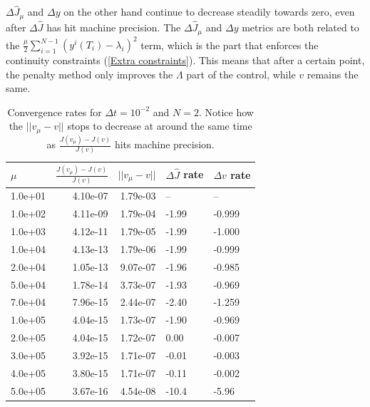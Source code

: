 \\
\\
$\Delta\hat J_{\mu}$ and $\Delta y$ on the other hand continue to decrease steadily towards zero, even after $\Delta \hat J$ has hit machine precision. The $\Delta\hat J_{\mu}$ and $\Delta y$ metrics are both related to the $\frac{\mu }{2}\sum_{i=1}^{N-1}(y^i(T_{i})-\lambda_i)^2$ term, which is the part that enforces the continuity constraints (\ref{Extra constraints}). This means that after a certain point, the penalty method only improves the $\Lambda$ part of the control, while $v$ remains the same. 
\begin{table}[!h]
\centering
\caption{Convergence rates for $\Delta t=10^{-2}$ and $N=2$. Notice how the $||v_{\mu}-v||$ stops to decrease at around the same time as $\frac{J(v_{\mu})-J(v)}{J(v)}$ hits machine precision.}
\label{Cosn_rate_table}
\begin{tabular}{lrrll}
\toprule
{} $\mu$&  $\frac{J(v_{\mu})-J(v)}{J(v)}$ &   $||v_{\mu}-v||$ &        $\Delta \hat J$ rate &        $\Delta v$ rate \\
\midrule
1.0e+01 &      4.10e-07 & 1.79e-03 &            -- &            -- \\
1.0e+02 &      4.11e-09 & 1.79e-04 & -1.99 & -0.999 \\
1.0e+03 &      4.12e-11 & 1.79e-05 & -1.99 & -1.000 \\
1.0e+04 &      4.13e-13 & 1.79e-06 & -1.99 & -0.999 \\
2.0e+04 &      1.05e-13 & 9.07e-07 & -1.96 & -0.985 \\
5.0e+04 &      1.78e-14 & 3.73e-07 & -1.93 & -0.969 \\
7.0e+04 &      7.96e-15 & 2.44e-07 & -2.40 & -1.259 \\
1.0e+05 &      4.04e-15 & 1.73e-07 & -1.90 & -0.969 \\
2.0e+05 &      4.04e-15 & 1.72e-07 &  0.00 & -0.007 \\
3.0e+05 &      3.92e-15 & 1.71e-07 & -0.01 & -0.003 \\
4.0e+05 &      3.80e-15 & 1.71e-07 & -0.11 & -0.002 \\
5.0e+05 &      3.67e-16 & 4.54e-08 & -10.4 & -5.96 \\
\bottomrule
\end{tabular}
\end{table}
